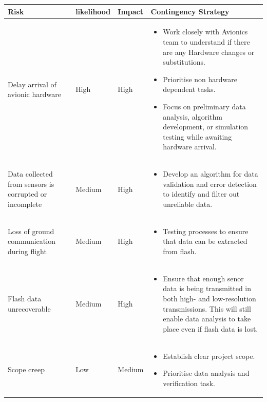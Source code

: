 \begin{table}[h]
\centering
\begin{tabular}{>{\raggedright}p{4cm}p{1.5cm}p{1.5cm}p{7cm}}
\toprule
\textbf{Risk} & \textbf{likelihood} & \textbf{Impact} & \textbf{Contingency Strategy} \\ \midrule
Delay arrival of avionic hardware & High & High & \vspace{-1.5em}
\begin{itemize}[leftmargin=*]
  \item Work closely with Avionics team to understand if there are any Hardware changes or substitutions.
  \item Prioritise non hardware dependent tasks.
  \item Focus on preliminary data analysis, algorithm development, or simulation testing while awaiting hardware arrival.
\end{itemize}\\\midrule
Data collected from sensors is corrupted or incomplete & Medium & High & \vspace{-1.5em}
\begin{itemize}[leftmargin=*]
  \item Develop an algorithm for data validation and error detection to identify and filter out unreliable data.
\end{itemize}\\\midrule
Loss of ground communication during flight & Medium & High & \vspace{-1.5em}
\begin{itemize}[leftmargin=*]
  \item Testing processes to ensure that data can be extracted from flash.
\end{itemize}\\\midrule
Flash data unrecoverable & Medium & High & \vspace{-1.5em}
\begin{itemize}[leftmargin=*]
  \item Ensure that enough senor data is being transmitted in both high- and low-resolution transmissions. This will still enable data analysis to take place even if flash data is lost.
\end{itemize}\\\midrule
Scope creep & Low & Medium & \vspace{-1.5em}
\begin{itemize}[leftmargin=*]
  \item Establish clear project scope.  
  \item Prioritise data analysis and verification task.  

\end{itemize}
\end{tabular}
\end{table}
